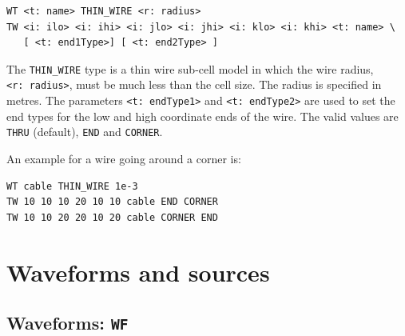 \documentclass[onecolumn,a4paper]{article}
\numberwithin{equation}{section}
\begin{document}
{\color{red}
\begin{verbatim}
WT <t: name> THIN_WIRE <r: radius>
TW <i: ilo> <i: ihi> <i: jlo> <i: jhi> <i: klo> <i: khi> <t: name> \
   [ <t: end1Type>] [ <t: end2Type> ]
\end{verbatim}

The \texttt{THIN\_WIRE} type is a thin wire sub-cell model in which the wire radius, \texttt{<r:~radius>}, must be much less 
than the cell size. The radius is specified in metres. The parameters \texttt{<t:~endType1>} and \texttt{<t:~endType2>} 
are used to set the end types for the low and high coordinate ends of the wire. The valid values are \texttt{THRU} (default), \texttt{END} and
\texttt{CORNER}.

An example for a wire going around a corner is:
\begin{verbatim} 
WT cable THIN_WIRE 1e-3 
TW 10 10 10 20 10 10 cable END CORNER
TW 10 10 20 20 10 20 cable CORNER END
\end{verbatim}
}

%
%
\section{Waveforms and sources}
\label{sc:wavsrc}
%
%

\subsection{Waveforms: \texttt{WF}}
\end{document}
